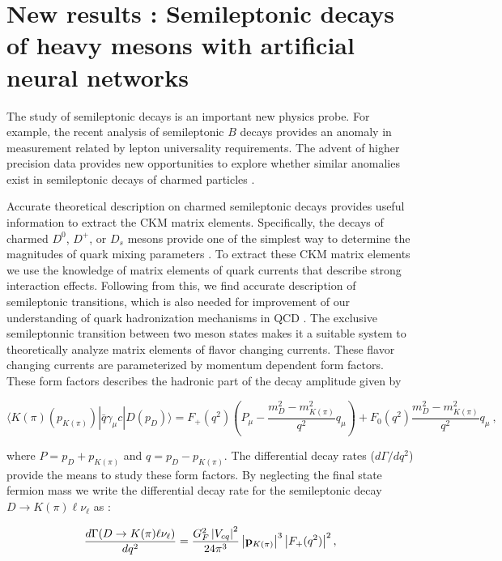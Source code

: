 \chapter{New results : Semileptonic decays of heavy mesons with artificial neural networks }\label{ANN_paper}

The study of semileptonic decays is an important new physics probe. For example, the recent analysis of semileptonic $B$ decays provides an anomaly in measurement related by lepton universality requirements. The advent of higher precision data provides new opportunities to explore whether similar anomalies exist in semileptonic decays of charmed particles \cite{Ablikim:2018evp, Ablikim:2018frk, Yuan:2019zfo, Riggio:2017zwh}.\par
Accurate theoretical description on charmed semileptonic decays provides useful information to extract the CKM matrix elements. Specifically, the decays of charmed $D^0$, $D^+$, or $D_s$ mesons provide one of the simplest way to determine the magnitudes of quark mixing parameters \cite{Grant:2019yar}. To extract these CKM matrix elements we use the knowledge of matrix elements of quark currents that describe strong interaction effects. Following from this, we find accurate description of semileptonic transitions, which is also needed for improvement of our understanding of quark hadronization mechanisms in QCD \cite{Grant:2019yar}. The exclusive semileptonnic transition between two meson states makes it a suitable system to theoretically analyze matrix elements of flavor changing currents. These flavor changing currents are parameterized by momentum dependent form factors. These form factors describes the hadronic part of the decay amplitude given by \cite{Grant:2019yar}

\begin{equation}\label{DPseudoscalar}
\langle K(\pi) (p_{K(\pi)}) | \bar q \gamma_\mu c | D (p_D) \rangle = F_+(q^2) \left(P_\mu - \frac{m_D^2-m_{K(\pi)}^2}{q^2} q_\mu \right) +
 F_0(q^2) \frac{m_D^2-m_{K(\pi)}^2}{q^2} q_\mu \ ,
\end{equation}

where $P = p_D + p_{K(\pi)}$ and $q = p_D - p_{K(\pi)}$. The differential decay rates ($d\Gamma/dq^2$) provide the means to study these form factors. By neglecting the final state fermion mass we write the differential decay rate for the semileptonic decay $D \rightarrow K(\pi) \ell \nu_{\ell}$ as \cite{Grant:2019yar}:

\begin{equation}\label{DifDistr}
\frac{d\Gamma(D \to K(\pi) \ell \nu_\ell)}{dq^2} =
\frac{G^2_F \left|V_{cq}\right|^2}{24 \pi^3} \left|{\bf p}_{K(\pi)}\right|^3 \left|F_+(q^2)\right|^2, 
\end{equation}

